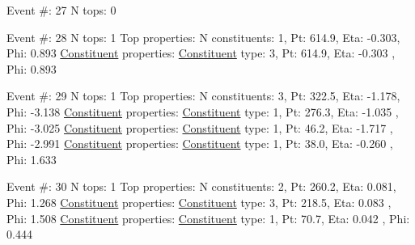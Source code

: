 \begin{DoxyCode}
Event #: 27
      N tops: 0

Event #: 28
      N tops: 1
      Top properties: N constituents:   1,   Pt:  614.9,   Eta:  -0.303,   Phi:   0.893
          \hyperlink{classConstituent}{Constituent} properties: \hyperlink{classConstituent}{Constituent} type:   3,   Pt:  614.9,   Eta:  -0.303
      ,   Phi:   0.893

Event #: 29
      N tops: 1
      Top properties: N constituents:   3,   Pt:  322.5,   Eta:  -1.178,   Phi:  -3.138
          \hyperlink{classConstituent}{Constituent} properties: \hyperlink{classConstituent}{Constituent} type:   1,   Pt:  276.3,   Eta:  -1.035
      ,   Phi:  -3.025
          \hyperlink{classConstituent}{Constituent} properties: \hyperlink{classConstituent}{Constituent} type:   1,   Pt:   46.2,   Eta:  -1.717
      ,   Phi:  -2.991
          \hyperlink{classConstituent}{Constituent} properties: \hyperlink{classConstituent}{Constituent} type:   1,   Pt:   38.0,   Eta:  -0.260
      ,   Phi:   1.633

Event #: 30
      N tops: 1
      Top properties: N constituents:   2,   Pt:  260.2,   Eta:   0.081,   Phi:   1.268
          \hyperlink{classConstituent}{Constituent} properties: \hyperlink{classConstituent}{Constituent} type:   3,   Pt:  218.5,   Eta:   0.083
      ,   Phi:   1.508
          \hyperlink{classConstituent}{Constituent} properties: \hyperlink{classConstituent}{Constituent} type:   1,   Pt:   70.7,   Eta:   0.042
      ,   Phi:   0.444
\end{DoxyCode}
 
